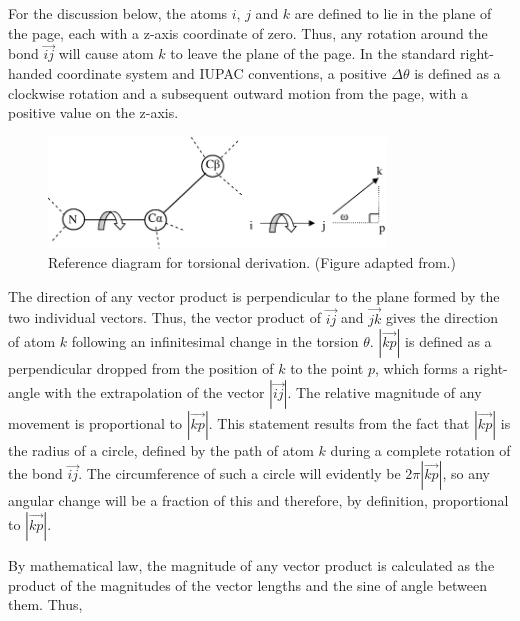 For the discussion below,  the atoms $i$, $j$ and $k$ are defined to lie in the plane of the page, each with a z-axis coordinate of zero. Thus, any rotation around the bond $\vec{ij}$ will cause atom $k$ to leave the plane of the page.
In the standard right-handed coordinate system and IUPAC conventions, a positive $\Delta\theta$ is defined as a clockwise rotation and a subsequent outward motion from the page, with a positive value on the z-axis.

\begin{figure}[hptb]
\begin{center}
\includegraphics[width=0.8\textwidth]{./06-PreArcus/torsional/definition_reference.pdf}
\end{center}
\caption[Reference diagram for torsional derivation.]{Reference diagram for torsional derivation. (Figure adapted from\cite{THESIS:BREWER}.)}
\label{fig:prearcus:vector_maths}
\end{figure}

The direction of any vector product is perpendicular to the plane formed by the two individual vectors. Thus, the vector product of $\vec{ij}$ and $\vec{jk}$  gives the direction of atom $k$ following an infinitesimal change in the torsion $\theta$. $\left\vert \vec{kp} \right\vert$ is defined as a perpendicular dropped from the position of $k$ to the point $p$, which forms a right-angle with the extrapolation of the vector $\left\vert \vec{ij} \right\vert$.
The relative magnitude of any movement is proportional to $\left\vert \vec{kp} \right\vert$. This statement results from the fact that $\left\vert \vec{kp} \right\vert$ is the radius of a circle, defined by the path of atom $k$ during a complete rotation of the bond $\vec{ij}$. The circumference of such a circle will evidently be $2\pi  \left\vert \vec{kp} \right\vert$, so any angular change will be a fraction of this and therefore, by definition, proportional to $\left\vert\vec{kp}\right\vert$.

By mathematical law, the magnitude of any vector product is calculated as the product of the magnitudes of the vector lengths and the sine of angle between them. Thus,

